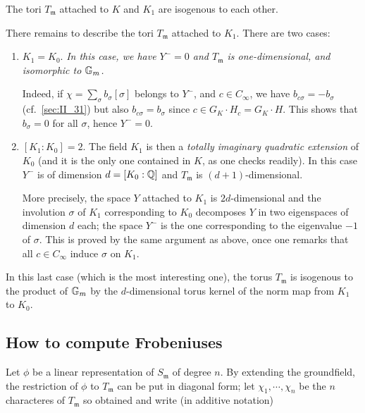 \begin{corp}
	The tori $T_{\mathfrak{m}}$ attached to $K$ and $K_1$ are isogenous to
	each other.
\end{corp}
There remains to describe the tori $T_{\mathfrak{m}}$ attached to $K_1$.  There
are two cases:
\begin{enumerate}[(1)]
\item $K_1 = K_0$.
	\emph{In this case, we have $Y^- = 0$ and $T_{\mathfrak{m}}$ is
	one-dimensional, and isomorphic to $\mathbb{G}_m$.}

	Indeed, if $\chi = \sum_{\sigma} b_\sigma[\sigma]$ belongs to $Y^-$,
	and $c \in C_\infty$, we have $b_{c \sigma} = -b_\sigma$ (cf.\
	\ref{sec:II_31}) but also $b_{c \sigma} = b_\sigma$ since $c \in G_K
	\cdot H_c = G_K \cdot H$. This shows that $b_\sigma = 0$ for all
	$\sigma$, hence $Y^- = 0$.

\item $[K_1 : K_0] = 2$.
	The field $K_1$ is then a \emph{totally imaginary quadratic extension}
	of $K_0$ (and it is the only one contained in $K$, as one checks
	readily). In this case $Y^-$ is of dimension $d = [K_0 : \mathbb{Q}]$ and
	$T_{\mathfrak{m}}$ is $(d+1)$-dimensional.

	More precisely, the space $Y$ attached to $K_1$ is $2d$-dimensional
	\dpage
	and the involution $\sigma$ of $K_1$ corresponding to $K_0$ decomposes
	$Y$ in two eigenspaces of dimension $d$ each; the space $Y^-$ is the
	one corresponding to the eigenvalue $-1$ of $\sigma$. This is proved by
	the same argument as above, once one remarks that all $c \in C_\infty$
	induce $\sigma$ on $K_1$.
\end{enumerate}

\begin{obs}
In this last case (which is the most interesting one), the torus
$T_{\mathfrak{m}}$ is isogenous to the product of $\mathbb{G}_m$ by the
$d$-dimensional torus kernel of the norm map from $K_1$ to $K_0$.
\end{obs}

\subsection{How to compute Frobeniuses} %
\label{sec:II_34}
Let $\phi$ be a linear representation of $S_\mathfrak{m}$ of degree
$n$. By extending the groundfield, the restriction of $ \phi $ to
$ T_\mathfrak{m} $ can be put in diagonal form; let $ \chi_1,\cdots, \chi_n $ 
be the $ n $ characteres of $T_\mathfrak{m}$ so obtained and write (in additive 
notation)

